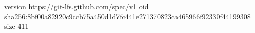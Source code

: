 version https://git-lfs.github.com/spec/v1
oid sha256:8bf00a82920c9ccb75a450d1d7fc441e271370823ca465966f92330f44199308
size 411
